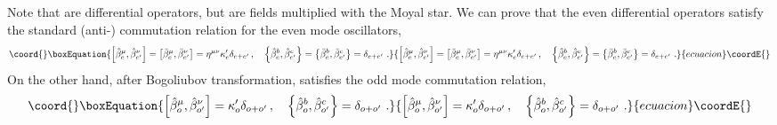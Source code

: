 \documentclass[a4paper,aps,preprint,nofootinbib,eqsecnum]{revtex4}
\begin{document}
Note that \coordHE{} are
differential operators, but \coordHE{} are fields multiplied with the
Moyal star. We can prove that the even differential operators \coordHE{} satisfy the standard
(anti-) commutation relation for the
even mode oscillators,
\begin{equation}\coord{}\boxEquation{
\left[ \hat{\beta}_{e}^{\mu },\hat{\beta}_{e^{\prime }}^{\nu }\right] =\left[
\bar{\beta}_{e}^{\mu },\bar{\beta}_{e^{\prime }}^{\nu }\right] =\eta ^{\mu
\nu }\kappa _{e}^{\prime }\delta _{e+e^{\prime }}\,,\quad \left\{ \hat{\beta}
_{e}^{b},\hat{\beta}_{e^{\prime }}^{c}\right\} =\left\{ \bar{\beta}_{e}^{b},
\bar{\beta}_{e^{\prime }}^{c}\right\} =\delta _{e+e^{\prime }}\,\,.
}{
\left[ \hat{\beta}_{e}^{\mu },\hat{\beta}_{e^{\prime }}^{\nu }\right] =\left[
\bar{\beta}_{e}^{\mu },\bar{\beta}_{e^{\prime }}^{\nu }\right] =\eta ^{\mu
\nu }\kappa _{e}^{\prime }\delta _{e+e^{\prime }}\,,\quad \left\{ \hat{\beta}
_{e}^{b},\hat{\beta}_{e^{\prime }}^{c}\right\} =\left\{ \bar{\beta}_{e}^{b},
\bar{\beta}_{e^{\prime }}^{c}\right\} =\delta _{e+e^{\prime }}\,\,.
}{ecuacion}\coordE{}\end{equation}%
On the other hand, after Bogoliubov transformation, \coordHE{}
satisfies the odd mode commutation relation,
\begin{equation}\coord{}\boxEquation{
\left[ \hat{\beta}_{o}^{\mu },\hat{\beta}_{o^{\prime }}^{\nu }\right]
=\kappa _{o}^{\prime }\delta _{o+o^{\prime }}\,,\quad \left\{ \hat{\beta}
_{o}^{b},\hat{\beta}_{o^{\prime }}^{c}\right\} =\delta _{o+o^{\prime }}\,\,.
}{
\left[ \hat{\beta}_{o}^{\mu },\hat{\beta}_{o^{\prime }}^{\nu }\right]
=\kappa _{o}^{\prime }\delta _{o+o^{\prime }}\,,\quad \left\{ \hat{\beta}
_{o}^{b},\hat{\beta}_{o^{\prime }}^{c}\right\} =\delta _{o+o^{\prime }}\,\,.
}{ecuacion}\coordE{}\end{equation}
\end{document}
